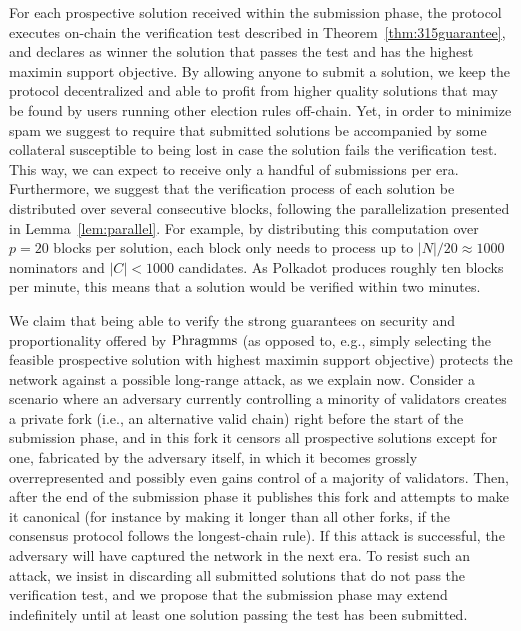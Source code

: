 For each prospective solution received within the submission phase, the protocol executes on-chain the verification test described in Theorem~\ref{thm:315guarantee}, and declares as winner the solution that passes the test and has the highest maximin support objective. 
By allowing anyone to submit a solution, we keep the protocol decentralized and able to profit from higher quality solutions that may be found by users running other election rules off-chain.
Yet, in order to minimize spam we suggest to require that submitted solutions be accompanied by some collateral susceptible to being lost in case the solution fails the verification test.
This way, we can expect to receive only a handful of submissions per era. 
Furthermore, we suggest that the verification process of each solution be distributed over several consecutive blocks, following the parallelization presented in Lemma~\ref{lem:parallel}. 
For example, by distributing this computation over $p=20$ blocks per solution, each block only needs to process up to $|N|/20\approx 1000$ nominators and $|C|<1000$ candidates. 
As Polkadot produces roughly ten blocks per minute, this means that a solution would be verified within two minutes. 

We claim that being able to verify the strong guarantees on security and proportionality offered by $\operatorname{Phragmms}$ (as opposed to, e.g., simply selecting the feasible prospective solution with highest maximin support objective) protects the network against a possible long-range attack, as we explain now. 
Consider a scenario where an adversary currently controlling a minority of validators creates a private fork (i.e., an alternative valid chain) right before the start of the submission phase, and in this fork it censors all prospective solutions except for one, fabricated by the adversary itself, in which it becomes grossly overrepresented and possibly even gains control of a majority of validators. 
Then, after the end of the submission phase it publishes this fork and attempts to make it canonical (for instance by making it longer than all other forks, if the consensus protocol follows the longest-chain rule). 
If this attack is successful, the adversary will have captured the network in the next era. 
To resist such an attack, we insist in discarding all submitted solutions that do not pass the verification test, and we propose that the submission phase may extend indefinitely until at least one solution passing the test has been submitted. 


